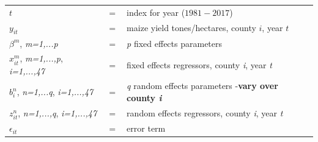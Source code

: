 \documentclass{beamer}              %
\begin{document}
\begin{frame}
\begin{table}
\begin{footnotesize}
\begin{tabular}{lll}
$t$&$=$&index for year ($1981-2017$) \\
$y_{\scriptscriptstyle it}$ &$=$&maize yield tones/hectares, county $i$, year $t$\\
${\beta}^{m}$, \footnotesize{\textit{m=1,...p}}&$=$&\textit{p} fixed effects parameters\\
$x^{m}_{it}$, \footnotesize{\textit{m=1,...,p}}, \footnotesize{\textit{i=1,...,47}} &$=$&fixed effects regressors, county \textit{i}, year \textit{t}\\
$b^{n}_i$, \footnotesize{\textit{n=1,...q}}, \footnotesize{\textit{i=1,...,47}}&$=$&\textit{q} random effects parameters -\textbf{vary over county \textit{i}}\\
$z^{n}_{it}$, \footnotesize{\textit{n=1,...,q}}, \footnotesize{\textit{i=1,...,47}} &$=$&random effects regressors, county \textit{i}, year \textit{t}\\
$\epsilon_{it}$ &$=$&error term \\
\end{tabular}
\end{footnotesize}
\end{table}

\end{frame}





\end{document}
